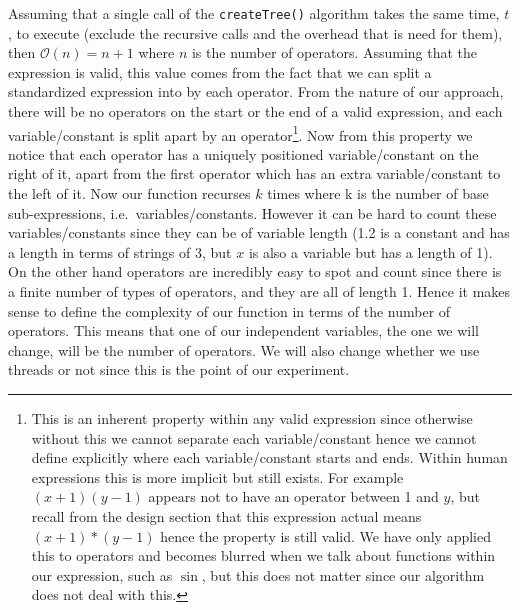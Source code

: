 \documentclass[../../../../../main.tex]{subfiles}
\begin{document}
Assuming that a single call of the \texttt{createTree()} algorithm takes the same time, $t$, to execute (exclude the recursive calls and the overhead that is need for them), then $\mathcal{O}(n) = n+1$ where $n$ is the number of operators. Assuming that the expression is valid, this value comes from the fact that we can split a standardized expression into by each operator. From the nature of our approach, there will be no operators on the start or the end of a valid expression, and each variable/constant is split apart by an operator\footnote{This is an inherent property within any valid expression since otherwise without this we cannot separate each variable/constant hence we cannot define explicitly where each variable/constant starts and ends. Within human expressions this is more implicit but still exists. For example $(x+1)(y-1)$ appears not to have an operator between 1 and $y$, but recall from the design section that this expression actual means $(x+1)*(y-1)$ hence the property is still valid. We have only applied this to operators and becomes blurred when we talk about functions within our expression, such as $\sin$, but this does not matter since our algorithm does not deal with this.}. 
Now from this property we notice that each operator has a uniquely positioned variable/constant on the right of it, apart from the first operator which has an extra variable/constant to the left of it. Now our function recurses $k$ times where k is the number of base sub-expressions, i.e.\ variables/constants. However it can be hard to count these variables/constants since they can be of variable length (1.2 is a constant and has a length in terms of strings of 3, but $x$ is also a variable but has a length of 1). On the other hand operators are incredibly easy to spot and count since there is a finite number of types of operators, and they are all of length 1. Hence it makes sense to define the complexity of our function in terms of the number of operators. This means that one of our independent variables, the one we will change, will be the number of operators. We will also change whether we use threads or not since this is the point of our experiment.
 
\end{document}
